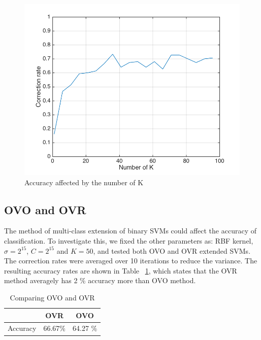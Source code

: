 \documentclass[10pt,twocolumn,letterpaper]{article}
\begin{document}
\begin{figure}
	\begin{center}
		\includegraphics[width=0.8\linewidth]{q3_k}
		\caption{Accuracy affected by the number of K}
		\label{fig:q3_k}
	\end{center}
\end{figure}

\subsection{OVO and OVR}
The method of multi-class extension of binary SVMs could affect the accuracy of classification. To investigate this, we fixed the other parameters as: RBF kernel, $\sigma = 2^{15}$, $C = 2^{15}$ and $K = 50$, and tested both OVO and OVR extended SVMs. The correction rates were averaged over 10 iterations to reduce the variance. The resulting accuracy rates are shown in Table ~\ref{tab:ovr_ovo}, which states that the OVR method averagely has 2 \% accuracy more than OVO method.  \\


\begin{table}[h!]
	\centering
	\caption{Comparing OVO and OVR}
	\label{tab:ovr_ovo}
	\begin{tabular}{ccc}
		\toprule
		~ & OVR & OVO\\
		\midrule
		Accuracy & 66.67\% & 64.27 \%\\
		\bottomrule
	\end{tabular}
\end{table}
\end{document}
